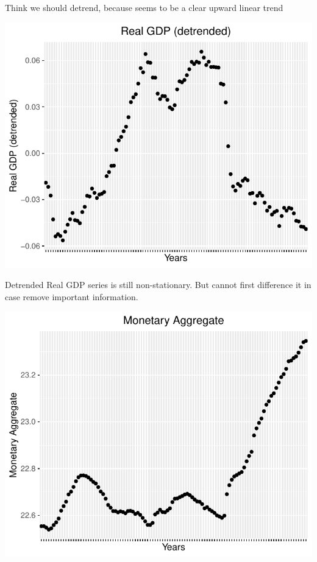 \documentclass[11pt,preprint, authoryear]{elsarticle}
\numberwithin{equation}{section}
\numberwithin{figure}{section}
\numberwithin{table}{section}
\begin{document}
Think we should detrend, because seems to be a clear upward linear trend

\begin{center}\includegraphics{README_files/figure-latex/unnamed-chunk-15-1} \end{center}

Detrended Real GDP series is still non-stationary. But cannot first
difference it in case remove important information.

\begin{center}\includegraphics{README_files/figure-latex/unnamed-chunk-18-1} \end{center}
\end{document}
